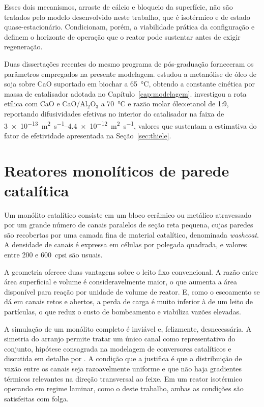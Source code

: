 Esses dois mecanismos, arraste de cálcio e bloqueio da superfície, não são
tratados pelo modelo desenvolvido neste trabalho, que é isotérmico e de estado
quase-estacionário. Condicionam, porém, a viabilidade prática da configuração e
definem o horizonte de operação que o reator pode sustentar antes de exigir
regeneração.

Duas dissertações recentes do mesmo programa de pós-graduação forneceram os
parâmetros empregados na presente modelagem.
\textcite{Melo2023} estudou a metanólise de óleo de soja sobre CaO suportado
em biochar a \SI{65}{\celsius}, obtendo a constante cinética por massa de
catalisador adotada no Capítulo~\ref{cap:modelagem}. \textcite{Fonseca2026}
investigou a rota etílica com CaO e CaO/Al$_2$O$_3$ a \SI{70}{\celsius} e razão
molar óleo:etanol de \num{1}:\num{9}, reportando difusividades efetivas no
interior do catalisador na faixa de \SIrange{3e-13}{4.4e-12}{\meter\squared\per\second},
valores que sustentam a estimativa do fator de efetividade apresentada na
Seção~\ref{sec:thiele}.

\section{Reatores monolíticos de parede catalítica}

Um monólito catalítico consiste em um bloco cerâmico ou metálico atravessado por
um grande número de canais paralelos de seção reta pequena, cujas paredes são
recobertas por uma camada fina de material catalítico, denominada
\textit{washcoat}. A densidade de canais é expressa em células por polegada
quadrada, e valores entre \num{200} e \num{600}~cpsi são usuais.

A geometria oferece duas vantagens sobre o leito fixo convencional. A razão
entre área superficial e volume é consideravelmente maior, o que aumenta a área
disponível para reação por unidade de volume de reator. E, como o escoamento se
dá em canais retos e abertos, a perda de carga é muito inferior à de um leito de
partículas, o que reduz o custo de bombeamento e viabiliza vazões elevadas.

A simulação de um monólito completo é inviável e, felizmente, desnecessária. A
simetria do arranjo permite tratar um único canal como representativo do
conjunto, hipótese consagrada na modelagem de conversores catalíticos e
discutida em detalhe por \textcite{HayesKolaczkowski1997}. A condição que a
justifica é que a distribuição de vazão entre os canais seja razoavelmente
uniforme e que não haja gradientes térmicos relevantes na direção transversal ao
feixe. Em um reator isotérmico operando em regime laminar, como o deste
trabalho, ambas as condições são satisfeitas com folga.


